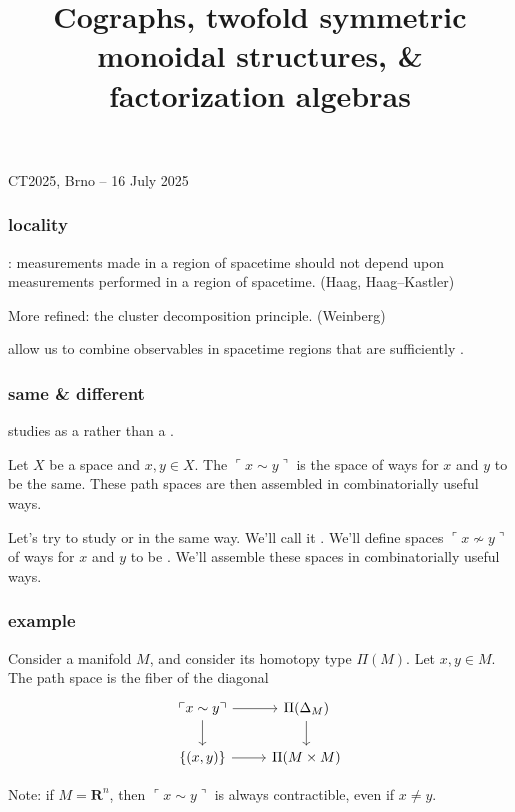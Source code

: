 \documentclass[11pt,xcolor={dvipsnames},hyperref={pdftex,pdfpagemode=UseNone,hidelinks,pdfdisplaydoctitle=true},usepdftitle=false]{beamer}
\newcommand{\enquine}[1]{\ulcorner {#1} \urcorner}
\begin{document}
\title{Cographs, twofold symmetric monoidal structures, \& factorization algebras}

{CT2025, Brno -- 16 July 2025}

\frame{\titlepage}

\begin{frame}
  \frametitle{locality}
  : measurements made in a region of spacetime should not depend upon measurements performed in a  region of spacetime. (Haag, Haag--Kastler)

  \bigskip

  More refined: the cluster decomposition principle. (Weinberg)

  \bigskip

   allow us to combine observables in spacetime regions that are sufficiently .
\end{frame}

\begin{frame}
  \frametitle{same \& different}
   studies  as a  rather than a .

  \bigskip

  Let $X$ be a space and $x,y \in X$.
  The  $\enquine{x \sim y}$ is the space of ways for $x$ and $y$ to be the same.
  These path spaces are then assembled in combinatorially useful ways.

  \bigskip

  Let's try to study  or  in the same way.
  We'll call it .
  We'll define spaces $\enquine{x \nsim y}$ of ways for $x$ and $y$ to be .
  We'll assemble these spaces in combinatorially useful ways.
\end{frame}

\begin{frame}
  \frametitle{example}
  Consider a manifold $M$, and consider its homotopy type $\Pi(M)$.
  Let $x,y \in M$.
  The path space is the fiber of the diagonal
  \[
  \begin{tikzcd}[ampersand replacement=\&]
    \enquine{x \sim y} \arrow[d] \arrow[r] \& \Pi(\Delta_M) \arrow[d] \\
    \{(x,y)\} \arrow[r] \& \Pi(M \times M)
  \end{tikzcd}
  \]

  Note: if $M = \mathbf{R}^n$, then $\enquine{x \sim y}$ is always contractible, even if $x \neq y$.
\end{frame}
\end{document}
